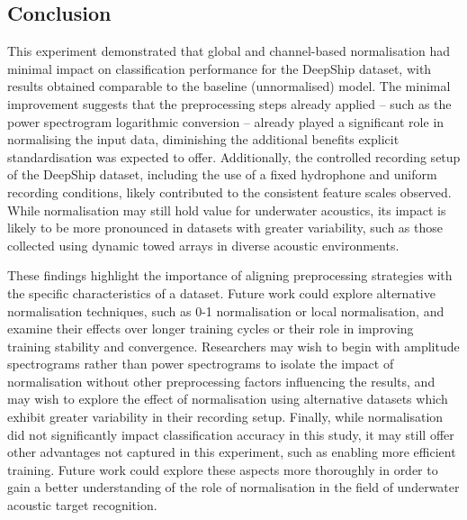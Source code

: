 \subsection{Conclusion}

This experiment demonstrated that global and channel-based normalisation had minimal impact on classification performance for the DeepShip dataset, with results obtained comparable to the baseline (unnormalised) model. The minimal improvement suggests that the preprocessing steps already applied -- such as the power spectrogram logarithmic conversion -- already played a significant role in normalising the input data, diminishing the additional benefits explicit standardisation was expected to offer. Additionally, the controlled recording setup of the DeepShip dataset, including the use of a fixed hydrophone and uniform recording conditions, likely contributed to the consistent feature scales observed. While normalisation may still hold value for underwater acoustics, its impact is likely to be more pronounced in datasets with greater variability, such as those collected using dynamic towed arrays in diverse acoustic environments.

These findings highlight the importance of aligning preprocessing strategies with the specific characteristics of a dataset. Future work could explore alternative normalisation techniques, such as 0-1 normalisation or local normalisation, and examine their effects over longer training cycles or their role in improving training stability and convergence. Researchers may wish to begin with amplitude spectrograms rather than power spectrograms to isolate the impact of normalisation without other preprocessing factors influencing the results, and may wish to explore the effect of normalisation using alternative datasets which exhibit greater variability in their recording setup. Finally, while normalisation did not significantly impact classification accuracy in this study, it may still offer other advantages not captured in this experiment, such as enabling more efficient training. Future work could explore these aspects more thoroughly in order to gain a better understanding of the role of normalisation in the field of underwater acoustic target recognition.